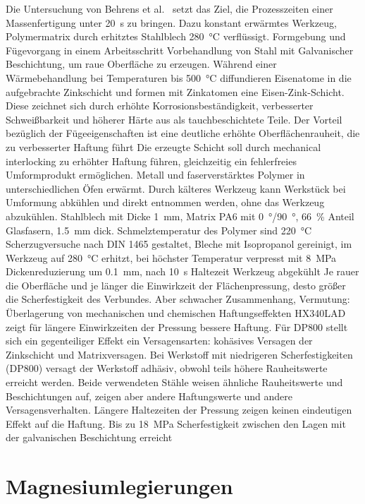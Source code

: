 Die Untersuchung von Behrens et al.~\cite{Behrens2019} setzt das Ziel, die Prozesszeiten einer Massenfertigung unter \SI{20}{\second} zu bringen.
Dazu konstant erwärmtes Werkzeug, Polymermatrix durch erhitztes Stahlblech \SI{280}{\degreeCelsius} verflüssigt.
Formgebung und Fügevorgang in einem Arbeitsschritt
Vorbehandlung von Stahl mit Galvanischer Beschichtung, um raue Oberfläche zu erzeugen.
Während einer Wärmebehandlung bei Temperaturen bis \SI{500}{\degreeCelsius} diffundieren Eisenatome in die aufgebrachte Zinkschicht und formen mit Zinkatomen eine Eisen-Zink-Schicht.
Diese zeichnet sich durch erhöhte Korrosionsbeständigkeit, verbesserter Schweißbarkeit und höherer Härte aus als tauchbeschichtete Teile.
Der Vorteil bezüglich der Fügeeigenschaften ist eine deutliche erhöhte Oberflächenrauheit, die zu verbesserter Haftung führt %
Die erzeugte Schicht soll durch mechanical interlocking zu erhöhter Haftung führen, gleichzeitig ein fehlerfreies Umformprodukt ermöglichen.
Metall und faserverstärktes Polymer in unterschiedlichen Öfen erwärmt.
Durch kälteres Werkzeug kann Werkstück bei Umformung abkühlen und direkt entnommen werden, ohne das Werkzeug abzukühlen.
Stahlblech mit Dicke \SI{1}{\mm}, Matrix PA6 mit \SI{0}{\degree}/\SI{90}{\degree}, \SI{66}{\percent} Anteil Glasfasern, \SI{1,5}{\mm} dick.
Schmelztemperatur des Polymer sind \SI{220}{\degreeCelsius}
Scherzugversuche nach DIN 1465 gestaltet, Bleche mit Isopropanol gereinigt, im Werkzeug auf \SI{280}{\degreeCelsius} erhitzt, bei höchster Temperatur verpresst mit \SI{8}{\MPa}
Dickenreduzierung um \SI{0,1}{\mm}, nach \SI{10}{\second} Haltezeit Werkzeug abgekühlt
Je rauer die Oberfläche und je länger die Einwirkzeit der Flächenpressung, desto größer die Scherfestigkeit des Verbundes.
Aber schwacher Zusammenhang, Vermutung: Überlagerung von mechanischen und chemischen Haftungseffekten
HX340LAD zeigt für längere Einwirkzeiten der Pressung bessere Haftung.
Für DP800 stellt sich ein gegenteiliger Effekt ein
Versagensarten: kohäsives Versagen der Zinkschicht und Matrixversagen.
Bei Werkstoff mit niedrigeren Scherfestigkeiten (DP800) versagt der Werkstoff adhäsiv, obwohl teils höhere Rauheitswerte erreicht werden.
Beide verwendeten Stähle weisen ähnliche Rauheitswerte und Beschichtungen auf, zeigen aber andere Haftungswerte und andere Versagensverhalten.
Längere Haltezeiten der Pressung zeigen keinen eindeutigen Effekt auf die Haftung.
Bis zu \SI{18}{\MPa} Scherfestigkeit zwischen den Lagen mit der galvanischen Beschichtung erreicht


\section{Magnesiumlegierungen}\label{sec:Mg}

